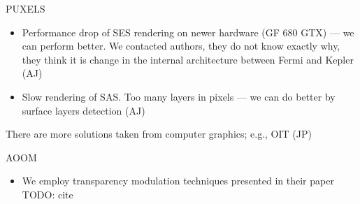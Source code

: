 PUXELS
\begin{itemize}
  \item Performance drop of SES rendering on newer hardware (GF 680 GTX) --- we can perform better. We contacted authors, they do not know exactly why, they think it is change in the internal architecture between Fermi and Kepler (AJ)
  \item Slow rendering of SAS. Too many layers in pixels --- we can do better by surface layers detection (AJ)
\end{itemize}

There are more solutions taken from computer graphics; e.g., OIT (JP)

AOOM
\begin{itemize}
  \item We employ transparency modulation techniques presented in their paper TODO: cite
\end{itemize}